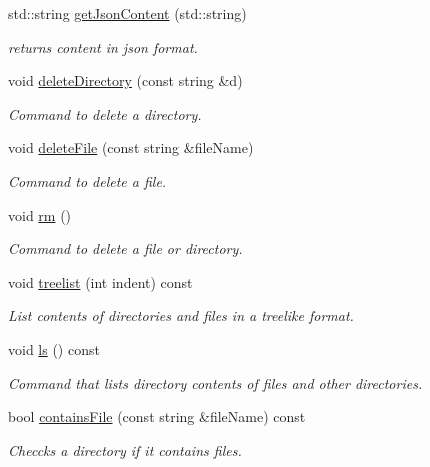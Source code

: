 \begin{DoxyCompactItemize}
\item 
std\+::string \hyperlink{class_directory_ad4b9f8d48a33526ac1c61dbce3753f1d}{get\+Json\+Content} (std\+::string)
\begin{DoxyCompactList}\small\item\em returns content in json format. \end{DoxyCompactList}\item 
void \hyperlink{class_directory_a8d233286b4964b8261543fa823e66f9e}{delete\+Directory} (const string \&d)
\begin{DoxyCompactList}\small\item\em Command to delete a directory. \end{DoxyCompactList}\item 
void \hyperlink{class_directory_ac5d2847c135eff94ce4fedd8099de18a}{delete\+File} (const string \&file\+Name)
\begin{DoxyCompactList}\small\item\em Command to delete a file. \end{DoxyCompactList}\item 
void \hyperlink{class_directory_ad764e9b4d0568c0acf788a15e0621f1a}{rm} ()
\begin{DoxyCompactList}\small\item\em Command to delete a file or directory. \end{DoxyCompactList}\item 
void \hyperlink{class_directory_af21c038562a88b24df0cb6e0c361febd}{treelist} (int indent) const
\begin{DoxyCompactList}\small\item\em List contents of directories and files in a treelike format. \end{DoxyCompactList}\item 
void \hyperlink{class_directory_a97bf31f9a554ff687a410f735d8770dd}{ls} () const
\begin{DoxyCompactList}\small\item\em Command that lists directory contents of files and other directories. \end{DoxyCompactList}\item 
bool \hyperlink{class_directory_a0286ef72f0d7cd5a0be7c15c0db46942}{contains\+File} (const string \&file\+Name) const
\begin{DoxyCompactList}\small\item\em Checcks a directory if it contains files. \end{DoxyCompactList}\item 

\end{DoxyCompactItemize}
